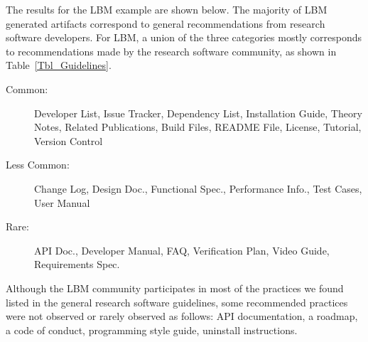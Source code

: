 \documentclass[runningheads]{llncs}
\begin{document}
The results for the LBM example are shown below.  The majority of LBM generated
artifacts correspond to general recommendations from research software
developers.  For LBM, a union of the three categories mostly corresponds to
recommendations made by the research software community, as shown in
Table~\ref{Tbl_Guidelines}.

\begin{description}
	\item[Common:] Developer List, Issue Tracker, Dependency List, Installation
	Guide, Theory Notes, Related Publications, Build Files, README File,
	License, Tutorial, Version Control
	\item[Less Common:] Change Log, Design Doc., Functional Spec., Performance
	Info., Test Cases, User Manual
	\item[Rare:] API Doc., Developer Manual, FAQ, Verification Plan, Video Guide,
	Requirements Spec.
\end{description}


Although the LBM community participates in most of the practices we found listed
in the general research software guidelines, some recommended practices were not
observed or rarely observed as follows: API documentation, a roadmap, a code of
conduct, programming style guide, uninstall instructions.
\end{document}
